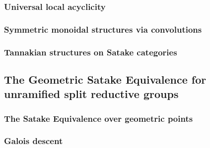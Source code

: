        \subsubsection{Universal local acyclicity}
        
        \subsubsection{Symmetric monoidal structures via convolutions}
        
        \subsubsection{Tannakian structures on Satake categories}
        
    \subsection{The Geometric Satake Equivalence for unramified split reductive groups}
        \subsubsection{The Satake Equivalence over geometric points}
        
        \subsubsection{Galois descent}